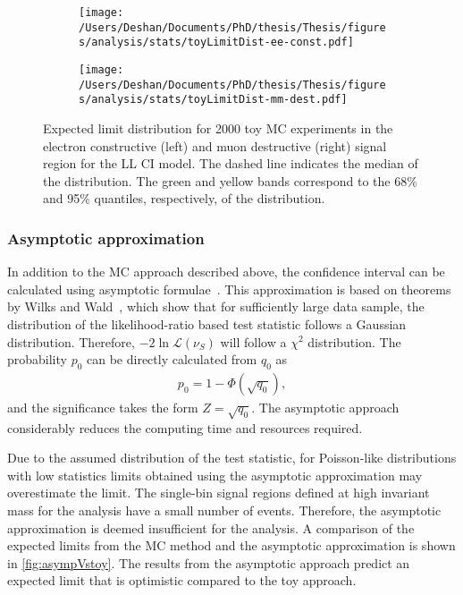 \begin{figure}[!htpb]
    \centering
    \begin{subfigure}[b]{0.49\textwidth}
        \centering
        \texttt{[image: /Users/Deshan/Documents/PhD/thesis/Thesis/figures/analysis/stats/toyLimitDist-ee-const.pdf]}
        \label{fig:toyDist1}
    \end{subfigure}
    \begin{subfigure}[b]{0.49\textwidth}
        \centering
        \texttt{[image: /Users/Deshan/Documents/PhD/thesis/Thesis/figures/analysis/stats/toyLimitDist-mm-dest.pdf]}
        \label{fig:toyDist2}
    \end{subfigure}
    \caption[Expected limit distribution for 2000 toy MC experiments.]{Expected limit distribution for 2000 toy MC experiments in the electron constructive (left) and muon destructive (right) signal region for the LL CI model. The dashed line indicates the median of the distribution. The green and yellow bands correspond to the 68\% and 95\% quantiles, respectively, of the distribution.}
    \label{fig:toyDist}
\end{figure}

\subsubsection{Asymptotic approximation}
In addition to the MC approach described above, the confidence interval can be calculated using asymptotic formulae~\cite{Cowan:2010js}. This approximation is based on theorems by Wilks and Wald~\cite{wilks1938}, which show that for sufficiently large data sample, the distribution of the likelihood-ratio based test statistic follows a Gaussian distribution. Therefore, $-2\ln\mathcal{L}(\nu_S)$ will follow a $\chi^2$ distribution. The probability $p_0$ can be directly calculated from $q_0$ as~\cite{Cowan:2010js}
\begin{equation}
    \label{eq:p0_asymp}
    \begin{aligned}
        p_0 = 1 - \Phi\left(\sqrt{q_0}\right),
    \end{aligned}
\end{equation}
and the significance takes the form $Z = \sqrt{q_0}$. The asymptotic approach considerably reduces the computing time and resources required. 

Due to the assumed distribution of the test statistic, for Poisson-like distributions with low statistics limits obtained using the asymptotic approximation may overestimate the limit. The single-bin signal regions defined at high invariant mass for the analysis have a small number of events. Therefore, the asymptotic approximation is deemed insufficient for the analysis. A comparison of the expected limits from the MC method and the asymptotic approximation is shown in \cref{fig:asympVstoy}. The results from the asymptotic approach predict an expected limit that is optimistic compared to the toy approach. 

